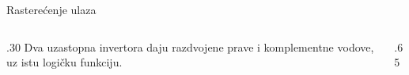 \begin{frame}[label=02-s021]{Rasterećenje ulaza}
\Rezultat{\(\textcolor{DEcrvena}{F=\bar CBA+C\bar BA+CB\bar A}\)}
\par\vspace{1mm}
\begin{columns}[c,onlytextwidth]
\begin{column}{.30\textwidth}
Dva uzastopna invertora daju razdvojene prave i komplementne vodove, uz istu logičku funkciju.
\end{column}
\begin{column}{.65\textwidth}\centering

\end{column}
\end{columns}
\end{frame}
